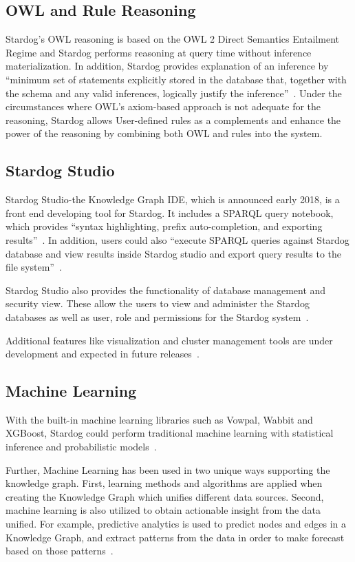 \subsection{OWL and Rule Reasoning}
Stardog’s OWL reasoning is based on the OWL 2 Direct Semantics Entailment 
Regime and Stardog performs reasoning at query time without inference 
materialization. In addition, Stardog provides explanation of an inference by 
``minimum set of statements explicitly stored in the database that, together 
with the schema and any valid inferences, logically justify the 
inference''~\cite{hid-sp18-405-www-stardog-docs}. Under the circumstances 
where OWL’s axiom-based approach is not adequate for the reasoning, 
Stardog allows User-defined rules as a complements and enhance the power 
of the reasoning by combining both OWL and rules into the system. 

\subsection{Stardog Studio}
Stardog Studio-the Knowledge Graph IDE, which is announced early 2018, is 
a front end developing tool for Stardog. It includes a SPARQL query 
notebook, which provides ``syntax highlighting, prefix auto-completion, and 
exporting results''~\cite{hid-sp18-405-blog-stardog-studio}. In addition, 
users could also ``execute SPARQL queries against Stardog database and 
view results inside Stardog studio and export query results to the file 
system''~\cite{hid-sp18-405-www-stardog-studio}.

Stardog Studio also provides the functionality of database management and 
security view. These allow the users to view and administer the Stardog 
databases as well as user, role and permissions for the Stardog 
system~\cite{hid-sp18-405-blog-stardog-studio}.

Additional features like visualization and cluster management tools are under 
development and expected in future 
releases~\cite{hid-sp18-405-www-stardog-studio}.

\subsection{Machine Learning}
With the built-in machine learning libraries such as Vowpal, Wabbit and 
XGBoost, Stardog could perform traditional machine learning with statistical 
inference and probabilistic 
models~\cite{hid-sp18-405-blog-stardog-xgboost}. 

Further, Machine Learning has been used in two unique ways supporting the 
knowledge graph. First, learning methods and algorithms are applied when 
creating  the Knowledge Graph which unifies different data sources. Second,  
machine learning is also utilized to obtain actionable insight from the data 
unified. For example, predictive analytics is used to predict nodes and
edges in a Knowledge Graph, and extract patterns from the data in order to 
make forecast based on those patterns~\cite{hid-sp18-405-blog-stardog-ml}.


